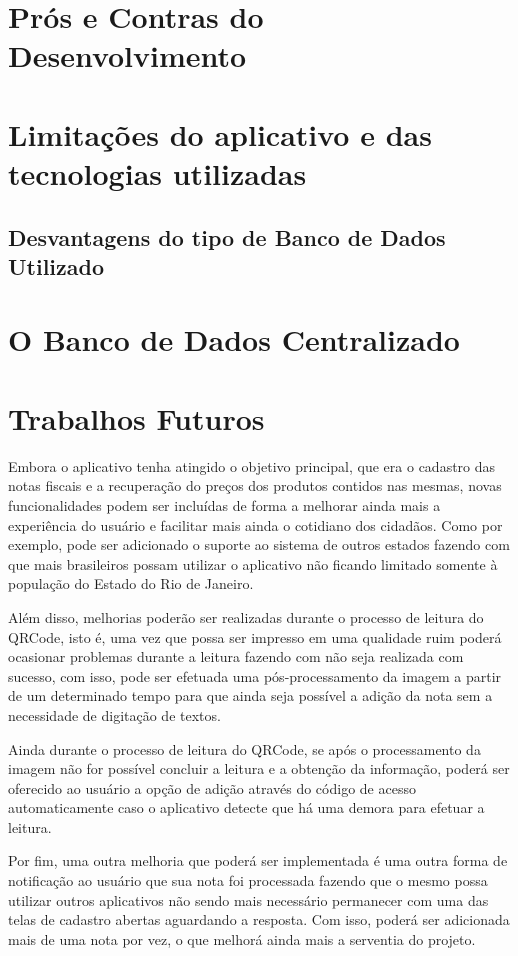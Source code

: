 
\section{Prós e Contras do Desenvolvimento}


\section{Limitações do aplicativo e das tecnologias utilizadas}
\subsection{Desvantagens do tipo de Banco de Dados Utilizado}

\section{O Banco de Dados Centralizado}

\section{Trabalhos Futuros}

Embora o aplicativo tenha atingido o objetivo principal, que era o cadastro das notas fiscais e a recuperação do preços dos produtos contidos nas mesmas, novas funcionalidades podem ser incluídas de forma a melhorar ainda mais a experiência do usuário e facilitar mais ainda o cotidiano dos cidadãos. Como por exemplo, pode ser adicionado o suporte ao sistema de outros estados fazendo com que mais brasileiros possam utilizar o aplicativo não ficando limitado somente à população do Estado do Rio de Janeiro.

Além disso, melhorias poderão ser realizadas durante o processo de leitura do QRCode, isto é, uma vez que possa ser impresso em uma qualidade ruim poderá ocasionar problemas durante a leitura fazendo com não seja realizada com sucesso, com isso, pode ser efetuada uma pós-processamento da imagem a partir de um determinado tempo para que ainda seja possível a adição da nota sem a necessidade de digitação de textos.

Ainda durante o processo de leitura do QRCode, se após o processamento da imagem não for possível concluir a leitura e a obtenção da informação, poderá ser oferecido ao usuário a opção de adição através do código de acesso automaticamente caso o aplicativo detecte que há uma demora para efetuar a leitura.

Por fim, uma outra melhoria que poderá ser implementada é uma outra forma de notificação ao usuário que sua nota foi processada fazendo que o mesmo possa utilizar outros aplicativos não sendo mais necessário permanecer com uma das telas de cadastro abertas aguardando a resposta. Com isso, poderá ser adicionada mais de uma nota por vez, o que melhorá ainda mais a serventia do projeto.
